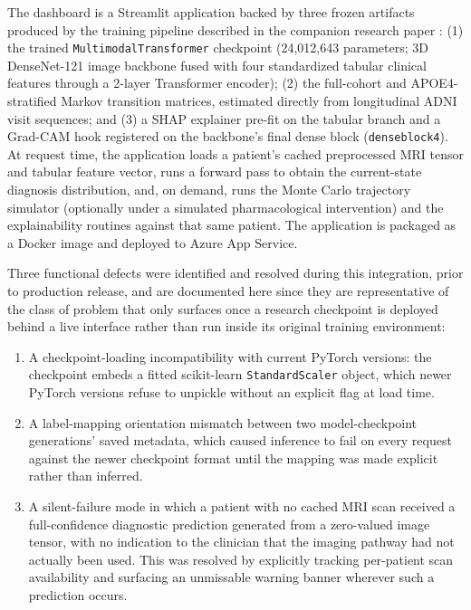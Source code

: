 \documentclass[5p,times,twocolumn]{elsarticle}
\begin{document}
The dashboard is a Streamlit \cite{bib_streamlit} application backed by three frozen artifacts produced by the training pipeline described in the companion research paper \cite{bib_bdt}: (1) the trained \texttt{MultimodalTransformer} checkpoint (24{,}012{,}643 parameters; 3D DenseNet-121 image backbone fused with four standardized tabular clinical features through a 2-layer Transformer encoder); (2) the full-cohort and APOE4-stratified Markov transition matrices, estimated directly from longitudinal ADNI visit sequences; and (3) a SHAP \cite{bib_shap} explainer pre-fit on the tabular branch and a Grad-CAM \cite{bib_gradcam} hook registered on the backbone's final dense block (\texttt{denseblock4}). At request time, the application loads a patient's cached preprocessed MRI tensor and tabular feature vector, runs a forward pass to obtain the current-state diagnosis distribution, and, on demand, runs the Monte Carlo trajectory simulator (optionally under a simulated pharmacological intervention) and the explainability routines against that same patient. The application is packaged as a Docker image and deployed to Azure App Service.

Three functional defects were identified and resolved during this integration, prior to production release, and are documented here since they are representative of the class of problem that only surfaces once a research checkpoint is deployed behind a live interface rather than run inside its original training environment:
\begin{enumerate}
\item A checkpoint-loading incompatibility with current PyTorch versions: the checkpoint embeds a fitted scikit-learn \texttt{StandardScaler} object, which newer PyTorch versions refuse to unpickle without an explicit flag at load time.
\item A label-mapping orientation mismatch between two model-checkpoint generations' saved metadata, which caused inference to fail on every request against the newer checkpoint format until the mapping was made explicit rather than inferred.
\item A silent-failure mode in which a patient with no cached MRI scan received a full-confidence diagnostic prediction generated from a zero-valued image tensor, with no indication to the clinician that the imaging pathway had not actually been used. This was resolved by explicitly tracking per-patient scan availability and surfacing an unmissable warning banner wherever such a prediction occurs.
\end{enumerate}
\end{document}
